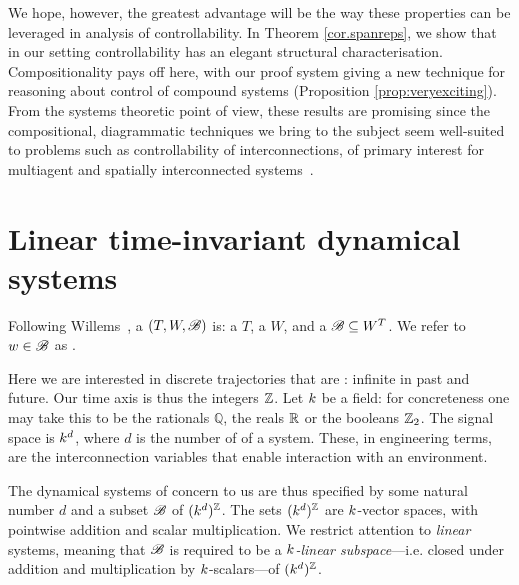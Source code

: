 We hope, however, the greatest advantage will be the way these properties can be
leveraged in analysis of controllability. In Theorem \ref{cor.spanreps}, we
show that in our setting controllability has an elegant structural
characterisation.  Compositionality pays off here, with our proof system giving
a new technique for reasoning about control of compound systems (Proposition
\ref{prop:veryexciting}).  From the systems theoretic point of view, these
results are promising since the compositional, diagrammatic techniques we bring
to the subject seem well-suited to problems such as controllability of
interconnections, of primary interest for multiagent and spatially
interconnected systems~\cite{OFM}.
%

\section{Linear time-invariant dynamical systems} \label{sec.systems}

Following Willems~\cite{Wi3}, a  $(T, W,{\mathscr B})$ is: a
 $T$, a  $W$, and a 
${\mathscr B} \subseteq W^T$. We refer to $w \in {\mathscr B}$ as . 

Here we are interested in discrete trajectories that are :
infinite in past and future.  Our time axis is thus the integers ${\mathbb Z}$.  Let $k$
be a field: for concreteness one may take this to be the rationals $\mathbb{Q}$,
the reals ${\mathbb{R}}$ or the booleans ${\mathbb Z}_2$.  The signal space is $k^d$, where $d$ is
the number of  of a system.  These, in engineering terms, are
the interconnection variables that enable interaction with an environment.

The dynamical systems of concern to us are thus specified by some natural number
$d$ and a subset ${\mathscr B}$ of $(k^d)^{\mathbb Z}$. The sets $(k^d)^{\mathbb Z}$ are $k$-vector
spaces, with pointwise addition and scalar multiplication. We restrict attention
to \emph{linear} systems, meaning that ${\mathscr B}$ is required to be a \emph{$k$-linear subspace}---i.e.
closed under addition and multiplication by $k$-scalars---of
$(k^d)^{\mathbb Z}$. 

